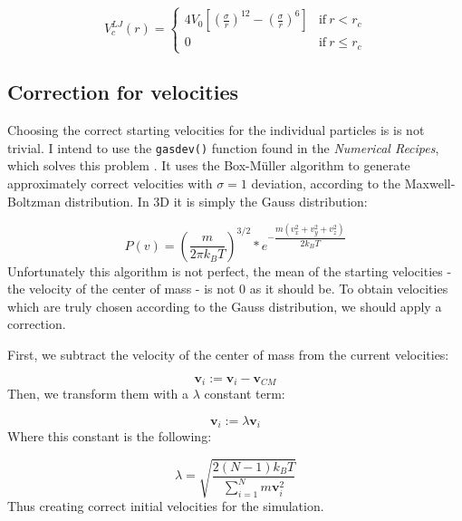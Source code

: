 \begin{multicols}{2}
\begin{equation}
V_{c}^{LJ} \left( r \right)
=
\begin{cases}
4 V_{0} \left[ \left( \frac{\sigma}{r} \right)^{12} - \left( \frac{\sigma}{r} \right)^{6} \right] & \text{if}\ r < r_{c} \\
0 & \text{if}\ r \leq r_{c}
\end{cases}
\end{equation}

\subsection{Correction for velocities}
Choosing the correct starting velocities for the individual particles is is not trivial. I intend to use the \texttt{gasdev()} function found in the \emph{Numerical Recipes}, which solves this problem \citep{press2007numerical}. It uses the Box-Müller algorithm to generate approximately correct velocities with $\sigma=1$ deviation, according to the Maxwell-Boltzman distribution. In 3D it is simply the Gauss distribution:

\begin{equation}
P \left( v \right)
=
\left( \frac{m}{2 \pi k_{B} T} \right)^{3/2}
*
e^{-\dfrac{m \left( v_{x}^{2} + v_{y}^{2} + v_{z}^{2} \right)}{2 k_{B} T}}
\end{equation}
Unfortunately this algorithm is not perfect, the mean of the starting velocities - the velocity of the center of mass - is not $0$ as it should be. To obtain velocities which are truly chosen according to the Gauss distribution, we should apply a correction. \par
First, we subtract the velocity of the center of mass from the current velocities:

\begin{equation}
\boldsymbol{v}_{i} := \boldsymbol{v}_{i} - \boldsymbol{v}_{CM}
\end{equation}
Then, we transform them with a $\lambda$ constant term:

\begin{equation}
\boldsymbol{v}_{i} := \lambda \boldsymbol{v}_{i}
\end{equation}
Where this constant is the following:

\begin{equation}
\lambda
=
\sqrt{\frac{2 \left( N - 1 \right) k_{B} T}{\sum_{i=1}^{N} m \boldsymbol{v}_{i}^{2}}}
\end{equation}
Thus creating correct initial velocities for the simulation. 


\end{multicols}
